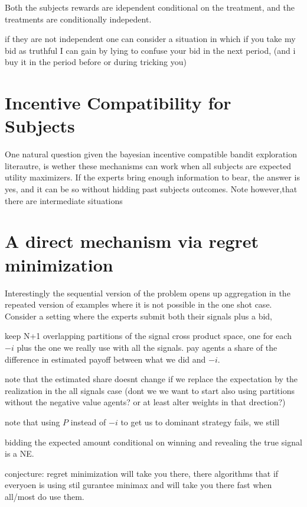 Both the subjects rewards are idependent conditional on the treatment, and the treatments are conditionally indepedent.

if they are not independent one can consider a situation in which if you take my bid as truthful I can gain by lying to confuse your bid in the next period, (and i buy it in the period before or during tricking you)




\section{Incentive Compatibility for Subjects}

One natural question given the bayesian incentive compatible bandit exploration literautre, is wether these mechanisms can work when all subjects are expected utility maximizers. If the experts bring enough information to bear, the answer is yes, and it can be so without hidding past subjects outcomes. Note however,that there are intermediate situations 



\section{A direct mechanism via regret minimization}

Interestingly the sequential version of the problem opens up aggregation in the repeated version of examples where it is not possible in the one shot case. Consider a setting where the experts submit both their signals plus a bid, 

 keep N+1 overlapping partitions of the signal cross product space, one for each $-i$ plus the one we really use with all the signals. pay agents a share of the difference in estimated payoff between what we did and $-i$.

note that the estimated share doesnt change if we replace the expectation by the realization in the all signals case (dont we we want to start also using partitions without the negative value agents? or at least alter weights in that drection?)

note that using $P$ instead of $-i$ to get us to dominant strategy fails, we still 

bidding the expected amount conditional on winning and revealing the true signal is a NE.

conjecture: regret minimization will take you there, there algorithms that if everyoen is using stil gurantee minimax and will take you there fast when all/most do use them.

